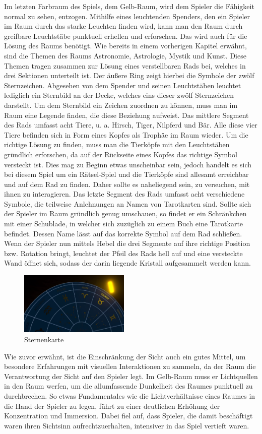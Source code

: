 Im letzten Farbraum des Spiels, dem Gelb-Raum, wird dem Spieler die Fähigkeit normal zu sehen, entzogen. Mithilfe eines leuchtenden Spenders, den ein Spieler im Raum durch das starke Leuchten finden wird, kann man den Raum durch greifbare Leuchtstäbe punktuell erhellen und erforschen. Das wird auch für die Lösung des Raums benötigt. Wie bereits in einem vorherigen Kapitel erwähnt, sind die Themen des Raums Astronomie, Astrologie, Mystik und Kunst. Diese Themen tragen zusammen zur Lösung eines verstellbaren Rads bei, welches in drei Sektionen unterteilt ist. Der äußere Ring zeigt hierbei die Symbole der zwölf Sternzeichen. Abgesehen von dem Spender und seinen Leuchtstäben leuchtet lediglich ein Sternbild an der Decke, welches eins dieser zwölf Sternzeichen darstellt. Um dem Sternbild ein Zeichen zuordnen zu können, muss man im Raum eine Legende finden, die diese Beziehung aufweist. Das mittlere Segment des Rads umfasst acht Tiere, u. a. Hirsch, Tiger, Nilpferd und Bär. Alle diese vier Tiere befinden sich in Form eines Kopfes als Trophäe im Raum wieder. Um die richtige Lösung zu finden, muss man die Tierköpfe mit den Leuchtstäben gründlich erforschen, da auf der Rückseite eines Kopfes das richtige Symbol versteckt ist. Dies mag zu Beginn etwas unscheinbar sein, jedoch handelt es sich bei diesem Spiel um ein Rätsel-Spiel und die Tierköpfe sind allesamt erreichbar und auf dem Rad zu finden. Daher sollte es naheliegend sein, zu versuchen, mit ihnen zu interagieren. Das letzte Segment des Rads umfasst acht verschiedene Symbole, die teilweise Anlehnungen an Namen von Tarotkarten sind. Sollte sich der Spieler im Raum gründlich genug umschauen, so findet er ein Schränkchen mit einer Schublade, in welcher sich zuzüglich zu einem Buch eine Tarotkarte befindet. Dessen Name lässt auf das korrekte Symbol auf dem Rad schließen. Wenn der Spieler nun mittels Hebel die drei Segmente auf ihre richtige Position bzw. Rotation bringt, leuchtet der Pfeil des Rads hell auf und eine versteckte Wand öffnet sich, sodass der darin liegende Kristall aufgesammelt werden kann.
\begin{figure}[h]
	\centering
	\includegraphics[width=\textwidth/3, height=3cm]{Pictures/Gelb-Raum_Sternenkarte}
	\caption{Sternenkarte}
	\label{fig:Gelb-Raum_sternenkarte}
\end{figure}
Wie zuvor erwähnt, ist die Einschränkung der Sicht auch ein gutes Mittel, um besondere Erfahrungen mit visuellen Interaktionen zu sammeln, da der Raum die Verantwortung der Sicht auf den Spieler legt. Im Gelb-Raum muss er Lichtquellen in den Raum werfen, um die allumfassende Dunkelheit des Raumes punktuell zu durchbrechen. So etwas Fundamentales wie die Lichtverhältnisse eines Raumes in die Hand der Spieler zu legen, führt zu einer deutlichen Erhöhung der Konzentration und Immersion. Dabei fiel auf, dass Spieler, die damit beschäftigt waren ihren Sichtsinn aufrechtzuerhalten, intensiver in das Spiel vertieft waren.

